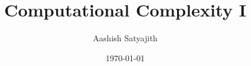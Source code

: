 \documentclass{beamer}
\title[Complexity I]{Computational Complexity I} %
\author{Aashish Satyajith} %
\institute[CMI] %
{
Chennai Mathematical Institute \\ %
\medskip
\textit{aashishsatyajith@gmail.com} %
}
\date{\today} %
\begin{document}
\begin{frame}
\titlepage %
\end{frame}






\end{document}

